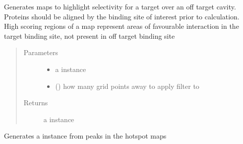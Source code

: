 \documentclass[letterpaper,10pt,english]{sphinxmanual}
\begin{document}
\begin{fulllineitems}
\begin{fulllineitems}
\end{fulllineitems}


\begin{fulllineitems}
\label{\detokenize{result_api:hotspots.result.Results.get_difference_map}}
Generates maps to highlight selectivity for a target over an off target cavity. Proteins should be aligned
by the binding site of interest prior to calculation.
High scoring regions of a map represent areas of favourable interaction in the target binding site, not
present in off target binding site
\begin{quote}\begin{description}
\item[{Parameters}] \leavevmode\begin{itemize}
\item {} 
 \textendash{} a {\hyperref[\detokenize{result_api:hotspots.result.Results}]{}} instance

\item {} 
 () \textendash{} how many grid points away to apply filter to

\end{itemize}

\item[{Returns}] \leavevmode
a {\hyperref[\detokenize{result_api:hotspots.result.Results}]{}} instance

\end{description}\end{quote}

\end{fulllineitems}


\begin{fulllineitems}
\label{\detokenize{result_api:hotspots.result.Results.get_pharmacophore_model}}
Generates a  instance from peaks in the hotspot maps


\end{fulllineitems}
\end{fulllineitems}
\end{document}
